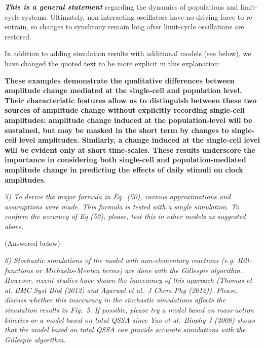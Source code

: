 \documentclass[11pt, letterpaper]{article}
\newenvironment{reviewer}{\itshape\color{gray}}{}
\newenvironment{manuscript}[1]{\begin{center}\begin{tcolorbox}[colback=green!5!white,colframe=green!75!black,width=0.8\textwidth,title={#1},breakable,fonttitle=\bfseries]}{\end{tcolorbox}\end{center}}
\begin{document}
{\bfseries\itshape This is a general statement} regarding the dynamics of populations and limit-cycle systems. Ultimately, non-interacting oscillators have no driving force to re-entrain, so changes to synchrony remain long after limit-cycle oscillations are restored.

In addition to adding simulation results with additional models (see below), we have changed the quoted text to be more explicit in this explanation:

\begin{manuscript}{Page 14}
  \bfseries
These examples demonstrate the qualitative differences between amplitude change mediated at the single-cell and population level.
Their characteristic features allow us to distinguish between these two sources of amplitude change without explicitly recording single-cell amplitudes: amplitude change induced at the population-level will be sustained, but may be masked in the short term by changes to single-cell level amplitudes.
Similarly, a change induced at the single-cell level will be evident only at short time-scales.
These results underscore the importance in considering both single-cell and population-mediated amplitude change in predicting the effects of daily stimuli on clock amplitudes.
\end{manuscript}

\begin{reviewer}
5) To derive the major formula in Eq.~(50), various approximations and assumptions were made.
This formula is tested with a single simulation.
To confirm the accuracy of Eq (50), please, test this in other models as suggested above.
\end{reviewer}

(Answered below)

\begin{reviewer}
6) Stochastic simulations of the model with non-elementary reactions (e.g.
Hill-functions or Michaelis-Menten terms) are done with the Gillespie algorithm.
However, recent studies have shown the inaccuracy of this approach (Thomas et al.
BMC Syst Biol (2012) and Agarwal et al.\ J Chem Phy (2012)).
Please, discuss whether this inaccuracy in the stochastic simulations affects the simulation results in Fig.~5.
If possible, please try a model based on mass-action kinetics or a model based on total QSSA since Yao et al.\ Biophy J (2008) shows that the model based on total QSSA can provide accurate simulations with the Gillespie algorithm.
\end{reviewer}
 
\end{document}
